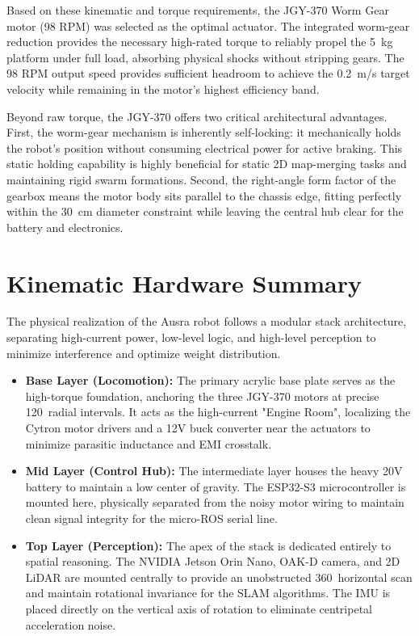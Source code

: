 Based on these kinematic and torque requirements, the JGY-370 Worm Gear motor (98 RPM) was selected as the optimal actuator. The integrated worm-gear reduction provides the necessary high-rated torque to reliably propel the 5~kg platform under full load, absorbing physical shocks without stripping gears. The 98 RPM output speed provides sufficient headroom to achieve the 0.2~m/s target velocity while remaining in the motor's highest efficiency band. 

Beyond raw torque, the JGY-370 offers two critical architectural advantages. First, the worm-gear mechanism is inherently self-locking: it mechanically holds the robot's position without consuming electrical power for active braking. This static holding capability is highly beneficial for static 2D map-merging tasks and maintaining rigid swarm formations. Second, the right-angle form factor of the gearbox means the motor body sits parallel to the chassis edge, fitting perfectly within the 30~cm diameter constraint while leaving the central hub clear for the battery and electronics.



\newpage

\section{Kinematic Hardware Summary}
\label{sec:cad_design}

The physical realization of the Ausra robot follows a modular stack architecture, separating high-current power, low-level logic, and high-level perception to minimize interference and optimize weight distribution.

\begin{itemize}
    \item \textbf{Base Layer (Locomotion):} The primary acrylic base plate serves as the high-torque foundation, anchoring the three JGY-370 motors at precise 120\degree\ radial intervals. It acts as the high-current "Engine Room", localizing the Cytron motor drivers and a 12V buck converter near the actuators to minimize parasitic inductance and EMI crosstalk.
    \item \textbf{Mid Layer (Control Hub):} The intermediate layer houses the heavy 20V battery to maintain a low center of gravity. The ESP32-S3 microcontroller is mounted here, physically separated from the noisy motor wiring to maintain clean signal integrity for the micro-ROS serial line.
    \item \textbf{Top Layer (Perception):} The apex of the stack is dedicated entirely to spatial reasoning. The NVIDIA Jetson Orin Nano, OAK-D camera, and 2D LiDAR are mounted centrally to provide an unobstructed 360\degree\ horizontal scan and maintain rotational invariance for the SLAM algorithms. The IMU is placed directly on the vertical axis of rotation to eliminate centripetal acceleration noise.
\end{itemize}

